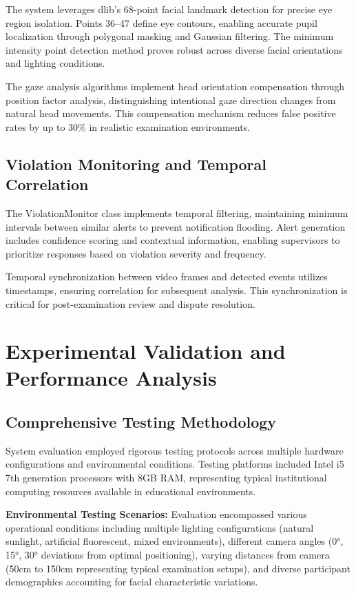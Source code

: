 \documentclass[conference]{IEEEtran}
\begin{document}
The system leverages dlib's 68-point facial landmark detection for precise eye region 
isolation\cite{el2023drowsiness}. Points 36--47 define eye contours, enabling accurate 
pupil localization through polygonal masking and Gaussian filtering. The minimum intensity 
point detection method proves robust across diverse facial orientations and lighting conditions.

The gaze analysis algorithms implement head orientation compensation through position factor 
analysis, distinguishing intentional gaze direction changes from natural head movements. 
This compensation mechanism reduces false positive rates by up to 30\% in realistic 
examination environments.

\subsection{Violation Monitoring and Temporal Correlation}

The ViolationMonitor class implements temporal filtering, maintaining minimum 
intervals between similar alerts to prevent notification flooding\cite{pythondatetime}. 
Alert generation includes confidence scoring and contextual information, enabling supervisors 
to prioritize responses based on violation severity and frequency.

Temporal synchronization between video frames and detected events utilizes timestamps, 
ensuring correlation for subsequent analysis. This synchronization 
is critical for post-examination review and dispute resolution\cite{pythonlogging}.

\section{Experimental Validation and Performance Analysis}

\subsection{Comprehensive Testing Methodology}

System evaluation employed rigorous testing protocols across multiple hardware configurations 
and environmental conditions. Testing platforms included Intel i5 7th generation processors 
with 8GB RAM, representing typical institutional computing resources available in educational 
environments.

\textbf{Environmental Testing Scenarios:} Evaluation encompassed various operational conditions 
including multiple lighting configurations (natural sunlight, artificial fluorescent, 
mixed environments), different camera angles (0°, 15°, 30° deviations from optimal positioning), 
varying distances from camera (50cm to 150cm representing typical examination setups), 
and diverse participant demographics accounting for facial characteristic variations.
\end{document}
